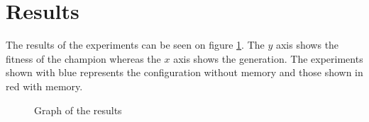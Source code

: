 
\section{Results}
The results of the experiments can be seen on figure \ref{experiments:graph:1}. The $ y $ axis shows the fitness of the champion whereas the $ x $ axis shows the generation. The experiments shown with blue represents the configuration without memory and those shown in red with memory. 

\begin{figure}[ht]
	\caption{Graph of the results}
	\label{experiments:graph:1}
\end{figure}